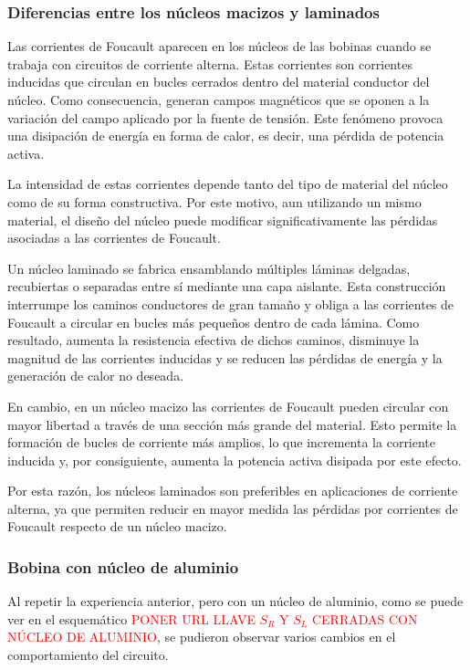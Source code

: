 \subsubsection{Diferencias entre los núcleos macizos y laminados}

Las corrientes de Foucault aparecen en los núcleos de las bobinas cuando se trabaja con circuitos de corriente alterna. Estas corrientes son corrientes inducidas que circulan en bucles cerrados dentro del material conductor del núcleo. Como consecuencia, generan campos magnéticos que se oponen a la variación del campo aplicado por la fuente de tensión. Este fenómeno provoca una disipación de energía en forma de calor, es decir, una pérdida de potencia activa.

La intensidad de estas corrientes depende tanto del tipo de material del núcleo como de su forma constructiva. Por este motivo, aun utilizando un mismo material, el diseño del núcleo puede modificar significativamente las pérdidas asociadas a las corrientes de Foucault.

Un núcleo laminado se fabrica ensamblando múltiples láminas delgadas, recubiertas o separadas entre sí mediante una capa aislante. Esta construcción interrumpe los caminos conductores de gran tamaño y obliga a las corrientes de Foucault a circular en bucles más pequeños dentro de cada lámina. Como resultado, aumenta la resistencia efectiva de dichos caminos, disminuye la magnitud de las corrientes inducidas y se reducen las pérdidas de energía y la generación de calor no deseada.

En cambio, en un núcleo macizo las corrientes de Foucault pueden circular con mayor libertad a través de una sección más grande del material. Esto permite la formación de bucles de corriente más amplios, lo que incrementa la corriente inducida y, por consiguiente, aumenta la potencia activa disipada por este efecto.

Por esta razón, los núcleos laminados son preferibles en aplicaciones de corriente alterna, ya que permiten reducir en mayor medida las pérdidas por corrientes de Foucault respecto de un núcleo macizo.




\subsubsection{Bobina con núcleo de aluminio}

Al repetir la experiencia anterior, pero con un núcleo de aluminio, como se puede ver en el esquemático \textcolor{red}{\MakeUppercase{Poner URL llave $S_R$ y $S_L$ cerradas con núcleo de aluminio}}, se pudieron observar varios cambios en el comportamiento del circuito.


